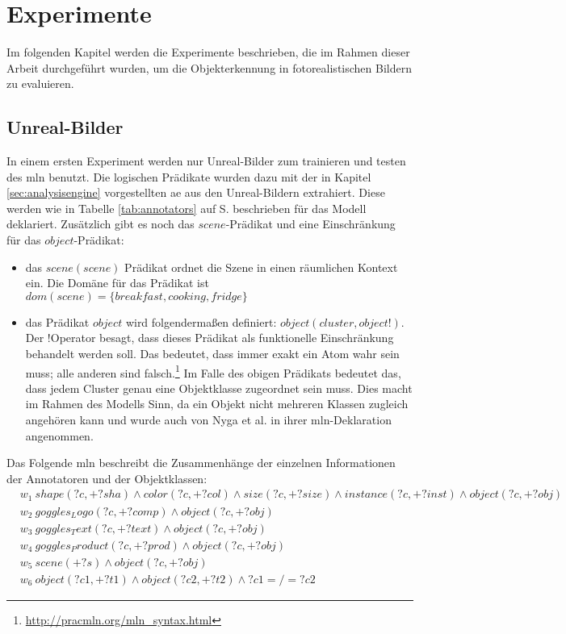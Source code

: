 \graphicspath{{./images/}}      
\def\CHAPTERONE{./chapters/Chapter-1} 

\chapter{Experimente}
\label{chap:experiments}
%	

Im folgenden Kapitel werden die Experimente beschrieben, die im Rahmen dieser Arbeit durchgeführt wurden, um die Objekterkennung in fotorealistischen Bildern zu evaluieren.  

\section{Unreal-Bilder}
\label{onlyUnrealImages}
In einem ersten Experiment werden nur Unreal-Bilder zum trainieren und testen des \gls{mln} benutzt. Die logischen Prädikate wurden dazu mit der in Kapitel \ref{sec:analysisengine} vorgestellten \gls{ae} aus den Unreal-Bildern extrahiert. Diese werden wie in Tabelle \ref{tab:annotators} auf S.\pageref{tab:annotators} beschrieben für das Modell deklariert. Zusätzlich gibt es noch das $scene$-Prädikat und eine Einschränkung für das $object$-Prädikat:
\begin{itemize}
\item das $scene(scene)$ Prädikat ordnet die Szene in einen räumlichen Kontext ein. Die Domäne für das Prädikat ist $dom(scene) = \{breakfast, cooking, fridge\}$
\item das Prädikat $object$ wird folgendermaßen definiert: $object(cluster, object!)$. Der \glqq!\grqq  Operator besagt, dass dieses Prädikat als funktionelle Einschränkung behandelt werden soll. Das bedeutet, dass immer exakt ein Atom wahr sein muss; alle anderen sind falsch.\footnote{\url{http://pracmln.org/mln_syntax.html}} Im Falle des obigen Prädikats bedeutet das, dass jedem Cluster genau eine Objektklasse zugeordnet sein muss. Dies macht im Rahmen des Modells Sinn, da ein Objekt nicht mehreren Klassen zugleich angehören kann und wurde auch von Nyga et al.\cite{pr2looking} in ihrer \gls{mln}-Deklaration angenommen.
\end{itemize}
Das Folgende \gls{mln} beschreibt die Zusammenhänge der einzelnen Informationen der Annotatoren und der Objektklassen:
\begin{align*}
& w_{1} \ shape(?c, +?sha) \wedge color(?c, +?col) \wedge size(?c, +?size) \wedge instance(?c, +?inst) \wedge object(?c, +?obj) \\
& w_{2} \ goggles_Logo(?c, +?comp) \wedge object(?c, +?obj)\\
& w_{3} \ goggles_Text(?c, +?text) \wedge object(?c, +?obj)\\
& w_{4} \ goggles_Product(?c, +?prod) \wedge object(?c, +?obj)\\
& w_{5} \ scene(+?s) \wedge object(?c, +?obj)\\
& w_{6} \ object(?c1, +?t1) \wedge object(?c2, +?t2) \wedge ?c1 =/= ?c2
\end{align*}
 
